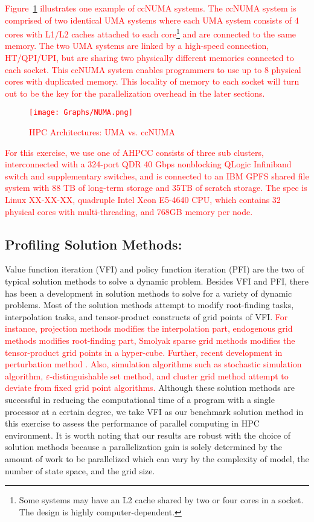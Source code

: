 \documentclass[12pt]{article}
\begin{document}
\textcolor{red}{
Figure~\ref{fig:numa} illustrates one example of ccNUMA systems. The ccNUMA system is comprised of two identical UMA systems where each UMA system consists of 4 cores with L1/L2 caches attached to each core\footnote{\sf Some systems may have an L2 cache shared by two or four cores in a socket. The design is highly computer-dependent.} and are connected to the same memory. The two UMA systems are linked by a high-speed connection, HT/QPI/UPI, but are sharing two physically different memories connected to each socket. This ccNUMA system enables programmers to use up to 8 physical cores with duplicated memory. This locality of memory to each socket will turn out to be the key for the parallelization overhead in the later sections.
\begin{figure}[t!]
\begin{center}
\caption{\sf HPC Architectures: UMA vs. ccNUMA}
\texttt{[image: Graphs/NUMA.png]}\label{fig:numa}
\end{center}
\end{figure}
}

\textcolor{red}{
For this exercise, we use one of AHPCC consists of three sub clusters, interconnected with a 324-port QDR 40 Gbps nonblocking QLogic Infiniband switch and supplementary switches, and is connected to an IBM GPFS shared file system with 88 TB of long-term storage and 35TB of scratch storage. The spec is Linux XX-XX-XX, quadruple Intel Xeon E5-4640 CPU, which contains 32 physical cores with multi-threading, and 768GB memory per node.
}


\subsection{Profiling Solution Methods:}
Value function iteration (VFI) and policy function iteration (PFI) are the two of typical solution methods to solve a dynamic problem. Besides VFI and PFI, there has been a development in solution methods to solve for a variety of dynamic problems. Most of the solution methods attempt to modify root-finding tasks, interpolation tasks, and tensor-product constructs of grid points of VFI. \textcolor{red}{For instance, projection methods \citep{Judd-92} modifies the interpolation part, endogenous grid methods \citep{Carroll-05} modifies root-finding part, Smolyak sparse grid methods \citep{Krueger-Kubler-04} modifies the tensor-product grid points in a hyper-cube. Further, recent development in perturbation method \citep{Judd-Guu-97}.
Also, simulation algorithms such as stochastic simulation algorithm, $\varepsilon$-distinguishable set method, and cluster grid method attempt to deviate from fixed grid point algorithms.} Although these solution methods are successful in reducing the computational time of a program with a single processor at a certain degree, we take VFI as our benchmark solution method in this exercise to assess the performance of parallel computing in HPC environment. It is worth noting that our results are robust with the choice of solution methods because a parallelization gain is solely determined by the amount of work to be parallelized which can vary by the complexity of model, the number of state space, and the grid size.
\end{document}
